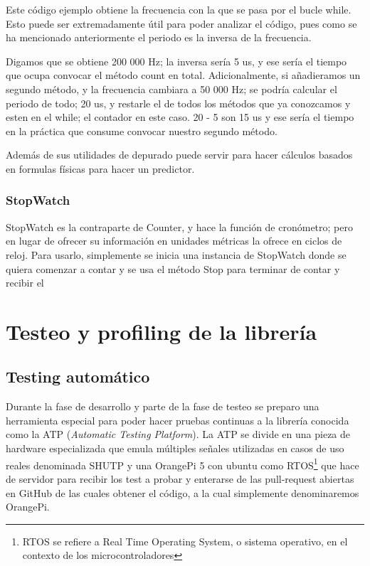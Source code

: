 \documentclass{report}
\begin{document}
Este código ejemplo obtiene la frecuencia con la que se pasa por el bucle while. Esto puede ser extremadamente útil para poder analizar el código, pues como se ha mencionado anteriormente el periodo es la inversa de la frecuencia. \par
Digamos que se obtiene 200 000 Hz; la inversa sería 5 us, y ese sería el tiempo que ocupa convocar el método count en total. Adicionalmente, si añadieramos un segundo método, y la frecuencia cambiara a 50 000 Hz; se podría calcular el periodo de todo; 20 us, y restarle el de todos los métodos que ya conozcamos y esten en el while; el contador en este caso. 20 - 5 son 15 us y ese sería el tiempo en la práctica que consume convocar nuestro segundo método.  
\par \vspace{0.3cm}
Además de sus utilidades de depurado puede servir para hacer cálculos basados en formulas físicas para hacer un predictor.  

\subsubsection{StopWatch}
StopWatch es la contraparte de Counter, y hace la función de cronómetro; pero en lugar de ofrecer su información en unidades métricas la ofrece en ciclos de reloj. Para usarlo, simplemente se inicia una instancia de StopWatch donde se quiera comenzar a contar y se usa el método Stop para terminar de contar y recibir el 


\section{Testeo y profiling de la librería}
\subsection{Testing automático}
Durante la fase de desarrollo y parte de la fase de testeo se preparo una herramienta especial para poder hacer pruebas continuas a la librería conocida como la ATP (\textit{Automatic Testing Platform}). La ATP se divide en una pieza de hardware especializada que emula múltiples señales utilizadas en casos de uso reales denominada SHUTP y una OrangePi 5 con ubuntu como RTOS\footnote{RTOS se refiere a Real Time Operating System, o sistema operativo, en el contexto de los microcontroladores} que hace de servidor para recibir los test a probar y enterarse de las pull-request abiertas en GitHub de las cuales obtener el código, a la cual simplemente denominaremos OrangePi. \par \vspace{0.3cm}
\end{document}
